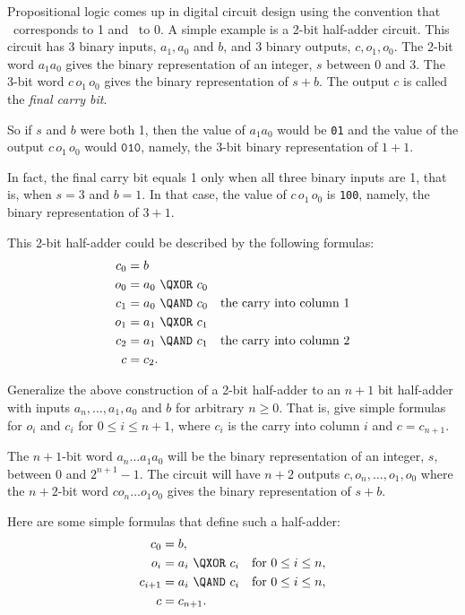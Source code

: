 \documentclass[handout]{mcs}
\begin{document}
\begin{problem}
  Propositional logic comes up in digital circuit design using the
  convention that \true\ corresponds to 1 and \false\ to 0.  A simple
  example is a 2-bit half-adder circuit.  This circuit has $3$ binary
  inputs, $a_1,a_0$ and $b$, and $3$ binary outputs, $c, o_1,o_0$.  The
  2-bit word $a_1a_0$ gives the binary representation of an integer, $s$
  between 0 and 3.  The 3-bit word $c\, o_1\, o_0$ gives the binary
  representation of $s+b$.
  The output $c$ is called the \emph{final carry bit}.

  So if $s$ and $b$ were both 1, then the value of $a_1a_0$ would be
  \texttt{01} and the value of the output $c\, o_1\, o_0$ would
  $\texttt{010}$, namely, the 3-bit binary representation of $1+1$.

  In fact, the final carry bit equals 1 only when all three binary inputs
  are 1, that is, when $s=3$ and $b=1$.  In that case, the value of $c\,
  o_1\, o_0$ is \texttt{100}, namely, the binary representation of $3+1$.

  This 2-bit half-adder could be described by the following formulas:
\begin{align*}
c_0 & = b \\
o_0 & = a_0\ \QXOR\ c_0\\
c_1 & = a_0\ \QAND\ c_0  & \text{the carry into  column 1}\\
o_1 & = a_1\ \QXOR\ c_1\\
c_2 & = a_1\ \QAND\ c_1 & \text{the carry into column 2}\\
c   & = c_2.
\end{align*}

\bparts

\ppart\label{anb} Generalize the above construction of a 2-bit half-adder
to an $n+1$ bit half-adder with inputs $a_n,\dots, a_1, a_0$ and $b$ for
arbitrary $n \geq 0$.  That is, give simple formulas for $o_{i}$ and
$c_{i}$ for $0 \leq i \leq n+1$, where $c_i$ is the carry into column $i$
and $c=c_{n+1}$.

\begin{solution}
 The $n+1$-bit word $a_n \dots a_1 a_0$ will be the binary
  representation of an integer, $s$, between 0 and $2^{n+1}-1$.  The
  circuit will have $n+2$ outputs $c, o_n, \dots, o_1, o_0$ where the
  $n+2$-bit word $c o_n \dots o_1 o_0$ gives the binary representation of
  $s+b$.

Here are some simple formulas that define such a half-adder:
\begin{align*}
c_0 & = b,\\
o_{i} & = a_{i}\ \QXOR\ c_{i}  & \text{for } 0 \leq i \leq n,\\
c_{i+1} &= a_i\ \QAND\ c_i & \text{for } 0 \leq i \leq n,\\
c & = c_{n+1}.
\end{align*}


\end{solution}
\end{problem}
\end{document}
